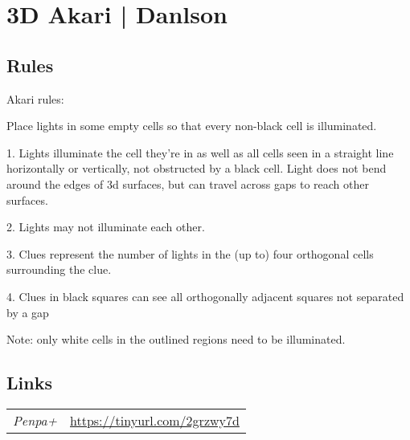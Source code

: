 \section{3D Akari | {\normalfont Danlson}}
\label{sec:17-3d-akari-danlson}

\subsection*{Rules}
\begin{markdown}
Akari rules:

Place lights in some empty cells so that every non-black cell is illuminated.

1. Lights illuminate the cell they’re in as well as all cells seen in a straight line horizontally or vertically, not obstructed by a black cell. Light does not bend around the edges of 3d surfaces, but can travel across gaps to reach other surfaces.

2. Lights may not illuminate each other.

3. Clues represent the number of lights in the (up to) four orthogonal cells surrounding the clue.

4. Clues in black squares can see all orthogonally adjacent squares not separated by a gap



Note:  only white cells in the outlined regions need to be illuminated.
\end{markdown}
\subsection*{Links}
\begin{tabularx}{\textwidth}{l X}
\emph{Penpa+} & \url{https://tinyurl.com/2grzwy7d} \\
\end{tabularx}
\pagebreak
